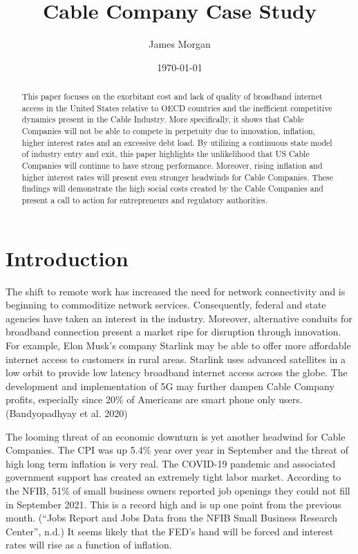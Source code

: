\documentclass[a4paper,oneside]{article}
\title{Cable Company Case Study}
\author{James Morgan}
\date{\today}
\begin{document}
\maketitle

\begin{singlespacing} %
	\begin{abstract}
		This paper focuses on the exorbitant cost and lack of quality of broadband internet access
		in the United States relative to OECD countries and the inefficient competitive
		dynamics present in the Cable Industry. More specifically, it shows that Cable Companies will
		not be able to compete in perpetuity due to innovation, inflation, higher interest rates and an
		excessive debt load. By utilizing a continuous state model of industry entry and exit, this paper
		highlights the unlikelihood that US Cable Companies will continue to have strong performance.
		Moreover, rising inflation and higher interest rates will present even stronger headwinds for
		Cable Companies. These findings will demonstrate the high social costs created by the Cable
		Companies and present a call to action for entrepreneurs and regulatory authorities.\end{abstract}
	\end{singlespacing}
\pagebreak

\section{Introduction}
	\:\:\:\:\:\: The shift to remote work has increased the need for network connectivity and is
	beginning to commoditize network services. Consequently, federal and state agencies have taken
	an interest in the industry. Moreover, alternative conduits for broadband connection present a
	market ripe for disruption through innovation. For example, Elon Musk's company Starlink may
	be able to offer more affordable internet access to customers in rural areas. Starlink uses
	advanced satellites in a low orbit to provide low latency broadband internet access across the
	globe. The development and implementation of 5G may further dampen Cable Company profits,
	especially since 20\% of Americans are smart phone only users. (Bandyopadhyay et al. 2020)

	The looming threat of an economic downturn is yet another headwind for Cable
	Companies. The CPI was up 5.4\% year over year in September and the threat of high long term
	inflation is very real. The COVID-19 pandemic and associated government support has created
	an extremely tight labor market. According to the NFIB, 51\% of small business owners reported
	job openings they could not fill in September 2021. This is a record high and is up one point
	from the previous month. (“Jobs Report and Jobs Data from the NFIB Small Business Research
	Center”, n.d.) It seems likely that the FED's hand will be forced and interest rates will rise as a
	function of inflation.
\end{document}
